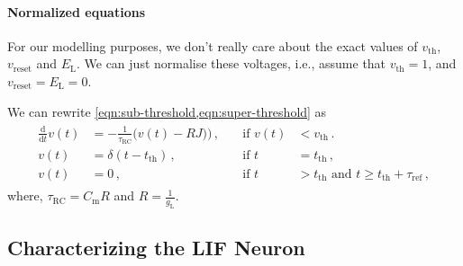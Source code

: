 \documentclass[10pt,letterpaper,oneside]{article}
\begin{document}
\paragraph{Normalized equations}
For our modelling purposes, we don't really care about the exact values of $v_\mathrm{th}$, $v_\mathrm{reset}$ and $E_\mathrm{L}$. We can just normalise these voltages, i.e., assume that $v_\mathrm{th} = 1$, and $v_\mathrm{reset} = E_\mathrm{L} = 0$.

We can rewrite \cref{eqn:sub-threshold,eqn:super-threshold} as
\begin{align}
	\begin{aligned}
		\frac{\mathrm{d}}{\mathrm{d}t} v(t) &= -\frac{1}{\tau_\mathrm{RC}} \big( v(t) - RJ \big)
		\big) \,, \quad &\text{if } v(t) &< v_\mathrm{th}\,. \\
		v(t) &= \delta(t - t_\mathrm{th}) \,, &\text{if } t &= t_\mathrm{th} \,,\\
v(t) &= 0 \,, &\text{if } t &> t_\mathrm{th} \text{ and } t \geq t_\mathrm{th} + \tau_\mathrm{ref} \,,
	\end{aligned}
	\label{eqn:sub-threshold-normalised}
\end{align}
where, $\tau_\mathrm{RC} = C_\mathrm{m} R$ and $R = \frac{1}{g_\mathrm{L}}$.

\subsection{Characterizing the LIF Neuron}
\end{document}
